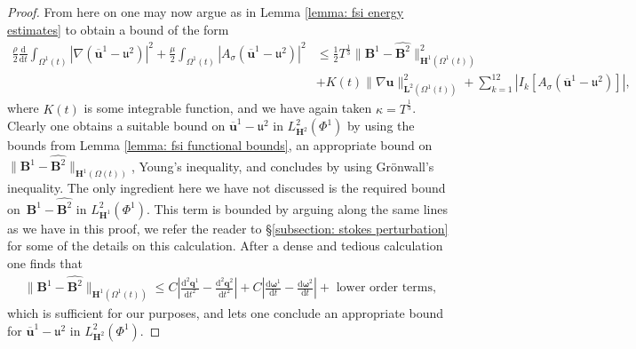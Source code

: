 \documentclass[a4paper]{amsart}
\numberwithin{equation}{section}
\newcommand{\grad}{\nabla}
\theoremstyle{plain}
\newcommand{\mbf}[1]{\mathbf{#1}}
\newcommand{\utwo}{\boldsymbol{\mathfrak{u}}^2}
\begin{document}
\begin{proof}
From here on one may now argue as in Lemma \ref{lemma: fsi energy estimates} to obtain a bound of the form
\begin{align*}
    \frac{\rho}{2} \frac{\mathrm{d}}{\mathrm{d}t} \int_{\Omega^1(t)} |\grad (\overline{\mbf{u}}^1 - \utwo)|^2 + \frac{\mu}{2} \int_{\Omega^1(t)} |A_{\sigma} (\overline{\mbf{u}}^1 - \utwo)|^2 &\leq \frac{1}{2}T^\frac{1}{3} \|\mbf{B}^1 - \widehat{\mbf{B}^2}\|_{\mbf{H}^1(\Omega^1(t))}^2\\
        &+ K(t)\|\grad \mbf{u}\|_{\mbf{L}^2(\Omega^1(t))}^2 + \sum_{k=1}^{12} |I_k[A_{\sigma}(\overline{\mbf{u}}^1 - \utwo)]|,
\end{align*}
where $K(t)$ is some integrable function, and we have again taken $\kappa = T^{\frac{1}{3}}$.
Clearly one obtains a suitable bound on $\overline{\mbf{u}}^1 - \utwo$ in $L^2_{\mbf{H}^2}(\Phi^1)$ by using the bounds from Lemma \ref{lemma: fsi functional bounds}, an appropriate bound on $\|\mbf{B}^1 - \widehat{\mbf{B}^2}\|_{\mbf{H}^1(\Omega(t))}$, Young's inequality, and concludes by using Gr\"onwall's inequality.
The only ingredient here we have not discussed is the required bound on~$\mbf{B}^1 - \widehat{\mbf{B}^2}$ in $L^2_{\mbf{H}^1}(\Phi^1)$.
This term is bounded by arguing along the same lines as we have in this proof, we refer the reader to \S \ref{subsection: stokes perturbation} for some of the details on this calculation.
After a dense and tedious calculation one finds that
\begin{align}
    \|\mbf{B}^1 - \widehat{\mbf{B}^2}\|_{\mbf{H}^1(\Omega^1(t))} \leq C \left| \frac{\mathrm{d}^2 \mbf{q}^1}{\mathrm{d}t^2} - \frac{\mathrm{d}^2 \mbf{q}^2}{\mathrm{d}t^2}\right| + C\left| \frac{\mathrm{d} \boldsymbol{\omega}^1}{\mathrm{d}t} - \frac{\mathrm{d} \boldsymbol{\omega}^2}{\mathrm{d}t}\right| + \text{ lower order terms}, \label{eqn: body force difference}
\end{align}
which is sufficient for our purposes, and lets one conclude an appropriate bound for $\overline{\mbf{u}}^1 - \utwo$ in $L^2_{\mbf{H}^2}(\Phi^1)$.


\end{proof}
\end{document}
